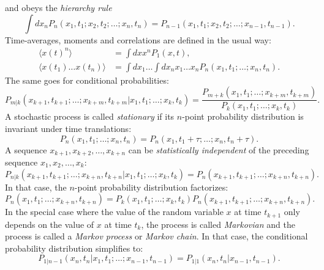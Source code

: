 and obeys the \textit{hierarchy rule}
\begin{equation}
    \int dx_n P_n(x_1, t_1; x_2, t_2; \dots; x_n, t_n) = P_{n-1}(x_1, t_1; x_2, t_2; \dots; x_{n-1}, t_{n-1}) \text{.}
    \label{eq:hierarchy-rule}
\end{equation}
Time-averages, moments and correlations are defined in the usual way:
\begin{align}
    \langle x(t)^n \rangle &= \int dx x^n P_1(x, t) \text{,} \label{eq:moments} \\
    \langle x(t_1) \dots x(t_n) \rangle &= \int dx_1 \dots \int dx_n x_1 \dots x_n P_n(x_1, t_1; \dots; x_n, t_n) \text{.} \label{eq:correlations}
\end{align}
The same goes for conditional probabilities:
\begin{equation}
    P_{m|k}(x_{k+1}, t_{k+1}; \dots; x_{k+m}, t_{k+m} | x_1, t_1; \dots; x_k, t_k) = \frac{P_{m+k}(x_1, t_1; \dots; x_{k+m}, t_{k+m})}{P_k(x_1, t_1; \dots; x_k, t_k)} \text{.}
    \label{eq:conditional-probability}
\end{equation}
A stochastic process is called \textit{stationary} if its $n$-point probability distribution is invariant under time translations:
\begin{equation}
    P_n(x_1, t_1; \dots; x_n, t_n) = P_n(x_1, t_1 + \tau; \dots; x_n, t_n + \tau) \text{.}
    \label{eq:stationary-process}
\end{equation}
A sequence $x_{k+1}, x_{k+2}, \dots, x_{k+n}$ can be \textit{statistically independent} of the preceding sequence $x_1, x_2, \dots, x_k$:
\begin{equation}
    P_{n|k}(x_{k+1}, t_{k+1}; \dots; x_{k+n}, t_{k+n} | x_1, t_1; \dots; x_k, t_k) = P_n(x_{k+1}, t_{k+1}; \dots; x_{k+n}, t_{k+n}) \text{.}
    \label{eq:independence}
\end{equation}
In that case, the $n$-point probability distribution factorizes:
\begin{equation}
    P_n(x_1, t_1; \dots; x_{k+n}, t_{k+n}) = P_k(x_1, t_1; \dots; x_k, t_k) P_n(x_{k+1}, t_{k+1}; \dots; x_{k+n}, t_{k+n}) \text{.}
    \label{eq:factorization}
\end{equation}
In the special case where the value of the random variable $x$ at time $t_{k+1}$ only depends on the value of $x$ at time $t_k$, the process is called \textit{Markovian} and the process is called a \textit{Markov process} or \textit{Markov chain}. In that case, the conditional probability distribution simplifies to:
\begin{equation}
    P_{1|n-1}(x_n, t_n | x_1, t_1; \dots; x_{n-1}, t_{n-1}) = P_{1|1}(x_n, t_n | x_{n-1}, t_{n-1}) \text{.}
    \label{eq:markov-chain}
\end{equation} 
